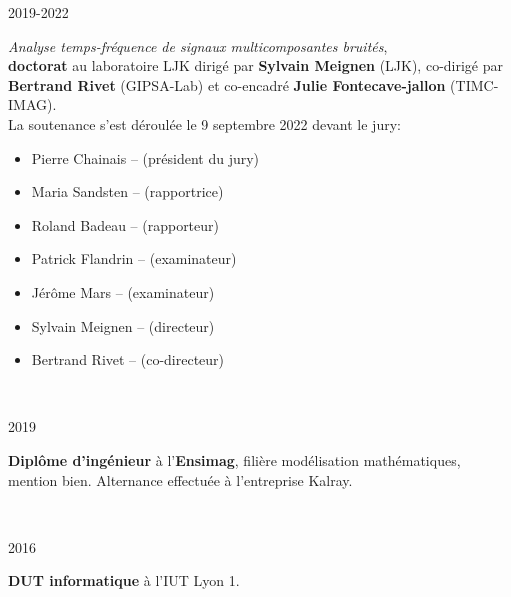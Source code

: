{	\noindent
	\begin{minipage}{0.20\textwidth}
		\color{MyGray} 2019-2022
	\end{minipage}
	\hfill
	\begin{minipage}{0.70\textwidth}
		\emph{Analyse temps-fréquence de signaux multicomposantes bruités},\\ \textbf{doctorat} au  laboratoire LJK dirigé par \textbf{Sylvain Meignen} (LJK), co-dirigé par \textbf{Bertrand Rivet} (GIPSA-Lab) et co-encadré \textbf{Julie Fontecave-jallon} (TIMC-IMAG).\\
		La soutenance s'est déroulée le 9 septembre 2022 devant le jury:
		\begin{itemize}
			\item[] Pierre Chainais -- (président du jury)
			\item[] Maria Sandsten -- (rapportrice)
			\item[] Roland Badeau -- (rapporteur)
			\item[] Patrick Flandrin -- (examinateur)
			\item[] Jérôme Mars -- (examinateur)
			\item[] Sylvain Meignen -- (directeur)
			\item[] Bertrand Rivet -- (co-directeur)
		\end{itemize}
	\end{minipage}\\
	\vspace{2mm}
	
	\noindent
	\begin{minipage}{0.20\textwidth}
		\color{MyGray} 2019
	\end{minipage}
	\hfill
	\begin{minipage}{0.70\textwidth}
		\textbf{Diplôme d'ingénieur} à l'\textbf{Ensimag}, filière modélisation mathématiques, mention bien. Alternance effectuée à l'entreprise Kalray.%
	\end{minipage}\\
	\vspace{2mm}
	
	\noindent
	\begin{minipage}{0.20\textwidth}
		\color{MyGray} 2016
	\end{minipage}
	\hfill
	\begin{minipage}{0.70\textwidth}
		\textbf{DUT informatique} à l'IUT Lyon 1.
	\end{minipage}\\
	\vspace{2mm}
	
}
